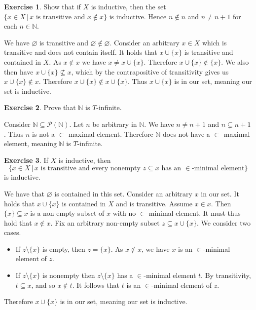 \documentclass{article}
\theoremstyle{definition}
\newtheorem{exer}{Exercise}[section]
\newcommand{\powset}[1]{\mathcal{P}(#1)}
\newcommand{\N}{\mathbb{N}}
\newcommand*{\mtset}{\ensuremath{\varnothing}}
\newlength{\defparindent}
\newenvironment{answer}
    {\begin{mdframed}[backgroundcolor=gray!15, linewidth=0pt] \setlength{\parindent}{\defparindent}}
    {\end{mdframed}}
\begin{document}
\begin{exer}
    Show that if $X$ is inductive, then the set $\{x \in X \, | \, x \text{ is transitive and } x \not\in x\}$ is inductive. Hence $n \not\in n$ and $n \ne n + 1$ for each $n \in \N$.

    \begin{answer}
        We have $\mtset$ is transitive and $\mtset \not\in \mtset$. Consider an arbitrary $x \in X$ which is transitive and does not contain itself. It holds that $x \cup \{x\}$ is transitive and contained in $X$. As $x \not\in x$ we have $x \ne x \cup \{x\}$. Therefore $x \cup \{x\} \not\in \{x\}$. We also then have $x \cup \{x\} \not\subseteq x$, which by the contrapositive of transitivity gives us $x \cup \{x\} \not\in x$. Therefore $x \cup \{x\} \not \in x \cup \{x\}$. Thus $x \cup \{x\}$ is in our set, meaning our set is inductive.  
    \end{answer}
\end{exer}

\begin{exer}
    Prove that $\N$ is $T$-infinite. 

    \begin{answer}
        Consider $\N \subseteq \powset{\N}$. Let $n$ be arbitrary in $\N$. We have $n \ne n + 1$ and $n \subsetneq n + 1$. Thus $n$ is not a $\subset$-maximal element. Therefore $\N$ does not have a $\subset$-maximal element, meaning $\N$ is $T$-infinite.
    \end{answer}
\end{exer}

\newpage

\begin{exer}
    If $X$ is inductive, then 
    \[
        \{x \in X \, | \, x \text{ is transitive and every nonempty $z \subseteq x$ has an $\in$-minimal element}\}
    \]
    is inductive.

    \begin{answer}
        We have that $\mtset$ is contained in this set. Consider an arbitrary $x$ in our set. It holds that $x \cup \{x\}$ is contained in $X$ and is transitive. Assume $x \in x$. Then $\{x\} \subseteq x$ is a non-empty subset of $x$ with no $\in$-minimal element. It must thus hold that $x \not\in x$. Fix an arbitrary non-empty subset $z \subseteq x \cup \{x\}$. We consider two cases. 
        \begin{itemize}
            \item If $z \setminus \{x\}$ is empty, then $z = \{x\}$. As $x \not\in x$, we have $x$ is an  $\in$-minimal element of $z$. 
            \item If $z \setminus \{x\}$ is nonempty then $z \setminus \{x\}$ has a $\in$-minimal element $t$. By transitivity, $t \subseteq x$, and so $x \not\in t$. It follows that $t$ is an $\in$-minimal element of $z$.
        \end{itemize}
        Therefore $x \cup \{x\}$ is in our set, meaning our set is inductive.
    \end{answer}
\end{exer}
\end{document}
